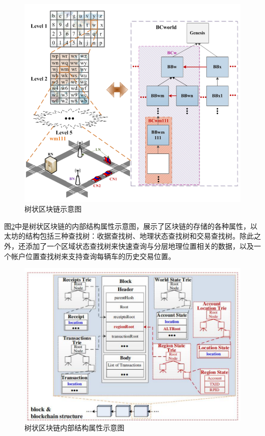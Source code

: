 \begin{figure}
	\centering
	\includegraphics[width=\textwidth]{figures/树状区块链示意图.png}
	\caption{树状区块链示意图}
	\label{fig:树状区块链示意图}
\end{figure}

图\ref{fig:树状区块链内部结构属性示意图}中是树状区块链的内部结构属性示意图，展示了区块链的存储的各种属性，以太坊的结构包括三种查找树：收据查找树、地理状态查找树和交易查找树。除此之外，还添加了一个区域状态查找树来快速查询与分层地理位置相关的数据，以及一个帐户位置查找树来支持查询每辆车的历史交易位置。

\begin{figure}
	\centering
	\includegraphics[width=\textwidth]{figures/树状区块链内部结构属性示意图.png}
	\caption{树状区块链内部结构属性示意图}
	\label{fig:树状区块链内部结构属性示意图}
\end{figure}

